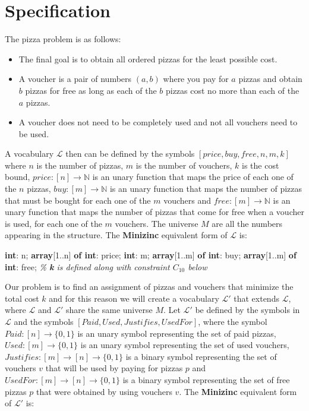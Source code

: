 \documentclass[conference]{IEEEtran}
\newcommand\tab[1][0.3cm]{\hspace*{#1}}
\begin{document}
\section{Specification}
The pizza problem is as follows:
\begin{itemize}
\item The final goal is to obtain all ordered pizzas for the least possible cost.
\item A voucher is a pair of numbers $(a, b)$ where you pay for $a$ pizzas and obtain $b$ pizzas for free as long as each of the $b$ pizzas cost no more than each of the $a$ pizzas.
\item A voucher does not need to be completely used and not all vouchers need to be used.
\end{itemize}
\tab A vocabulary $\mathcal{L}$ then can be defined by the symbols $[ price, buy, free, n, m, k ]$ where $n$ is the number of pizzas, $m$ is the number of vouchers, $k$ is the cost bound, $price : [n] \rightarrow \mathbb{N}$ is an unary function that maps the price of each one of the $n$ pizzas, $buy : [m] \rightarrow \mathbb{N}$ is an unary function that maps the number of pizzas that must be bought for each one of the $m$ vouchers and $free : [m] \rightarrow \mathbb{N}$ is an unary function that maps the number of pizzas that come for free when a voucher is used, for each one of the $m$ vouchers. The universe $M$ are all the numbers appearing in the structure. The \textbf{Minizinc} equivalent form of $\mathcal{L}$ is:
\begin{algorithmic}
\State \textbf{int}: n;
\State \textbf{array}[1..n] \textbf{of int}: price;
\State \textbf{int}: m;
\State \textbf{array}[1..m] \textbf{of int}: buy;
\State \textbf{array}[1..m] \textbf{of int}: free;
\State \textit{\% \textbf{k} is defined along with constraint $C_{10}$ below}
\\
\end{algorithmic}
\tab Our problem is to find an assignment of pizzas and vouchers that minimize the total cost $k$ and for this reason we will create a vocabulary $\mathcal{L'}$ that extends $\mathcal{L}$, where $\mathcal{L}$  and $\mathcal{L'}$ share the same universe $M$. Let $\mathcal{L'}$ be defined by the symbols in $\mathcal{L}$ and the symbols $[ Paid, Used, Justifies, UsedFor ]$, where the symbol $Paid : [n] \rightarrow \{ 0, 1\}$ is an unary symbol representing the set of paid pizzas, $Used: [m] \rightarrow \{ 0, 1\}$ is an unary symbol representing the set of used vouchers, $Justifies: [m] \rightarrow [n] \rightarrow \{ 0, 1\}$ is a binary symbol representing the set of vouchers $v$ that will be used by paying for pizzas $p$ and $UsedFor: [m] \rightarrow [n] \rightarrow \{ 0, 1\}$ is a binary symbol representing the set of free pizzas $p$ that were obtained by using vouchers $v$. The \textbf{Minizinc} equivalent form of $\mathcal{L'}$ is:
\end{document}
